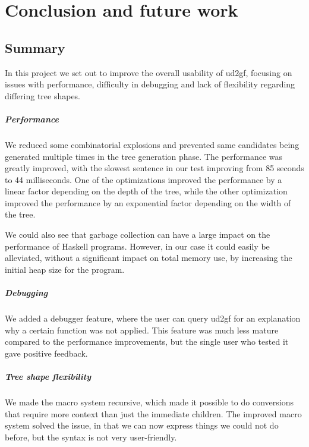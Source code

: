 \chapter{Conclusion and future work}
\section{Summary}

In this project we set out to improve the overall usability of ud2gf, focusing on issues with performance, difficulty in debugging and lack of flexibility regarding differing tree shapes. 

\paragraph*{Performance}
We reduced some combinatorial explosions and prevented same candidates being generated multiple times in the tree generation phase. The performance was greatly improved, with the slowest sentence in our test improving from 85 seconds to 44 milliseconds. One of the optimizations improved the performance by a linear factor depending on the depth of the tree, while the other optimization improved the performance by an exponential factor depending on the width of the tree.

We could also see that garbage collection can have a large impact on the performance of Haskell programs. However, in our case it could easily be alleviated, without a significant impact on total memory use, by increasing the initial heap size for the program.

\paragraph*{Debugging}
We added a debugger feature, where the user can query ud2gf for an explanation why a certain function was not applied. This feature was much less mature compared to the performance improvements, but the single user who tested it gave positive feedback. 

\paragraph*{Tree shape flexibility}
We made the macro system recursive, which made it possible to do conversions that require more context than just the immediate children. The improved macro system solved the issue, in that we can now express things we could not do before, but the syntax is not very user-friendly.

